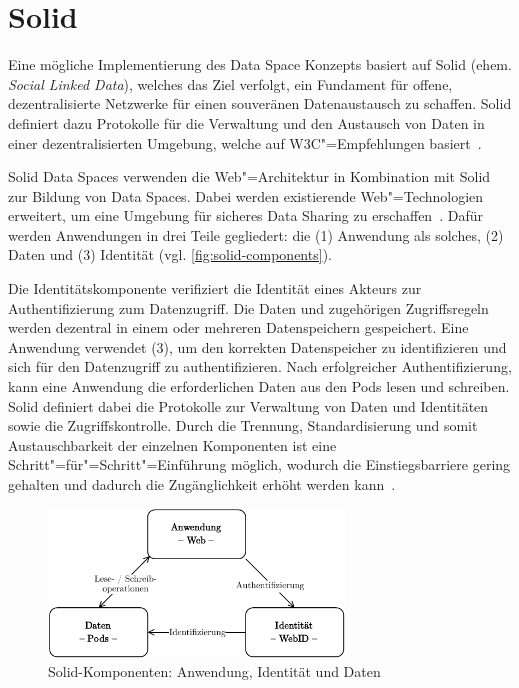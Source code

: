
\section{Solid}

Eine mögliche Implementierung des Data Space Konzepts basiert auf Solid (ehem. \emph{Social Linked Data}), welches das Ziel verfolgt, ein Fundament für offene, dezentralisierte Netzwerke für einen souveränen Datenaustausch zu schaffen.
Solid definiert dazu Protokolle für die Verwaltung und den Austausch von Daten in einer dezentralisierten Umgebung, welche auf W3C"=Empfehlungen basiert~\cite{mecklerWebLinkedData2023}.

Solid Data Spaces verwenden die Web"=Architektur in Kombination mit Solid zur Bildung von Data Spaces.
Dabei werden existierende Web"=Technologien erweitert, um eine Umgebung für sicheres Data Sharing zu erschaffen~\cite{mecklerWebLinkedData2023}.
Dafür werden Anwendungen in drei Teile gegliedert: die (1) Anwendung als solches, (2) Daten und (3) Identität (vgl. \autoref{fig:solid-components}).

Die Identitätskomponente verifiziert die Identität eines Akteurs zur Authentifizierung zum Datenzugriff.
Die Daten und zugehörigen Zugriffsregeln werden dezentral in einem oder mehreren Datenspeichern gespeichert.
Eine Anwendung verwendet (3), um den korrekten Datenspeicher zu identifizieren und sich für den Datenzugriff zu authentifizieren.
Nach erfolgreicher Authentifizierung, kann eine Anwendung die erforderlichen Daten aus den Pods lesen und schreiben.
Solid definiert dabei die Protokolle zur Verwaltung von Daten und Identitäten sowie die Zugriffskontrolle.
Durch die Trennung, Standardisierung und somit Austauschbarkeit der einzelnen Komponenten ist eine Schritt"=für"=Schritt"=Einführung möglich, wodurch die Einstiegsbarriere gering gehalten und dadurch die Zugänglichkeit erhöht werden kann~\cite{mecklerWebLinkedData2023}.

\begin{figure}[b]
    \includegraphics[width=0.7\textwidth]{./assets/solid_triangle.drawio.pdf}
    \caption{Solid-Komponenten: Anwendung, Identität und Daten}
    \label{fig:solid-components}
\end{figure}


